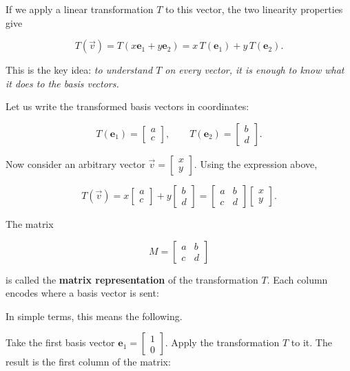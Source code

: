 \documentclass[11pt,openany]{book}
\theoremstyle{definition}
\begin{document}
If we apply a linear transformation $T$ to this vector, the two linearity properties give

\[
T(\vec{v}) = T(x\mathbf{e}_1 + y\mathbf{e}_2) = x\,T(\mathbf{e}_1) + y\,T(\mathbf{e}_2).
\]

This is the key idea: \textit{to understand $T$ on every vector, it is enough to know 
what it does to the basis vectors.}

\medskip

Let us write the transformed basis vectors in coordinates:

\[
T(\mathbf{e}_1) = \begin{bmatrix} a \\ c \end{bmatrix}, 
\qquad
T(\mathbf{e}_2) = \begin{bmatrix} b \\ d \end{bmatrix}.
\]

Now consider an arbitrary vector $\vec{v} = \begin{bmatrix} x \\ y \end{bmatrix}$. 
Using the expression above,

\[
T(\vec{v}) = x \begin{bmatrix} a \\ c \end{bmatrix} + y \begin{bmatrix} b \\ d \end{bmatrix}
=
\begin{bmatrix}
a & b \\
c & d
\end{bmatrix}
\begin{bmatrix}
x \\
y
\end{bmatrix}.
\]

The matrix

\[
M =
\begin{bmatrix}
a & b \\
c & d
\end{bmatrix}
\]

is called the \textbf{matrix representation} of the transformation $T$. Each column encodes 
where a basis vector is sent:

In simple terms, this means the following.

\medskip

Take the first basis vector $\mathbf{e}_1 = \begin{bmatrix}1 \\ 0\end{bmatrix}$. 
Apply the transformation $T$ to it. The result is the first column of the matrix:
\end{document}
